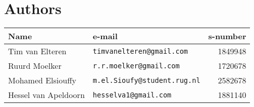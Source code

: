 
\chapter*{Authors}
%
\begin{tabularx}{\textwidth}{lXr}%
\toprule
\bf Name 					& \bf e-mail & \bf s-number \\
\toprule
	Tim van Elteren 		& {\tt timvanelteren@gmail.com} 			& 1849948\\
	Ruurd Moelker 	& {\tt r.r.moelker@gmail.com} 			& 1720678\\
	Mohamed Elsiouffy 	& {\tt m.el.Sioufy@student.rug.nl} 			& 2582678\\
	Hessel van Apeldoorn & {\tt hesselva1@gmail.com} 					& 1881140\\
\bottomrule
\end{tabularx}
